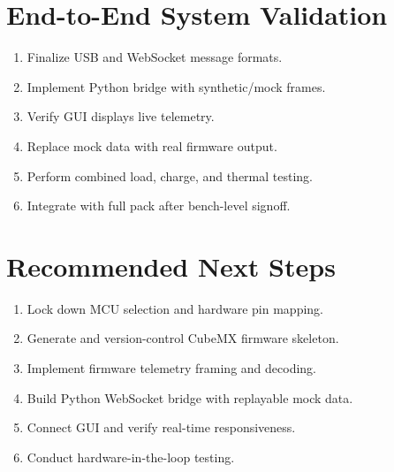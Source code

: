 \documentclass[12pt]{article}
\begin{document}
\section{End-to-End System Validation}

\begin{enumerate}
\item Finalize USB and WebSocket message formats.
\item Implement Python bridge with synthetic/mock frames.
\item Verify GUI displays live telemetry.
\item Replace mock data with real firmware output.
\item Perform combined load, charge, and thermal testing.
\item Integrate with full pack after bench-level signoff.
\end{enumerate}

\section{Recommended Next Steps}

\begin{enumerate}
\item Lock down MCU selection and hardware pin mapping.
\item Generate and version-control CubeMX firmware skeleton.
\item Implement firmware telemetry framing and decoding.
\item Build Python WebSocket bridge with replayable mock data.
\item Connect GUI and verify real-time responsiveness.
\item Conduct hardware-in-the-loop testing.
\end{enumerate}
\end{document}
